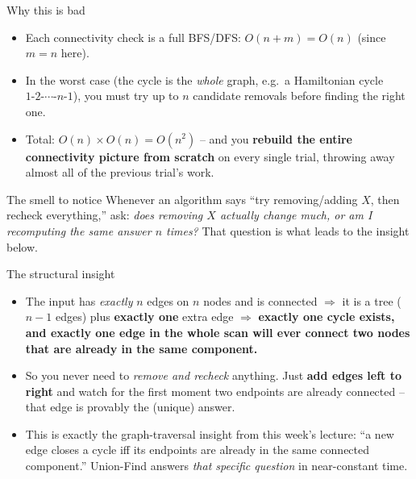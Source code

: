 \documentclass[11pt,aspectratio=169]{beamer}
\begin{document}
\begin{frame}{Why this is bad}
  \begin{itemize}
    \item Each connectivity check is a full BFS/DFS: $O(n+m) = O(n)$ (since $m=n$ here).
    \item In the worst case (the cycle is the \emph{whole} graph, e.g.\ a Hamiltonian
    cycle $1\text{-}2\text{-}\cdots\text{-}n\text{-}1$), you must try up to $n$ candidate
    removals before finding the right one.
    \item Total: $O(n) \times O(n) = O(n^2)$ -- and you \textbf{rebuild the entire
    connectivity picture from scratch} on every single trial, throwing away almost all
    of the previous trial's work.
  \end{itemize}
  \begin{alertblock}{The smell to notice}
    Whenever an algorithm says ``try removing/adding $X$, then recheck everything,''
    ask: \emph{does removing $X$ actually change much, or am I recomputing the same
    answer $n$ times?} That question is what leads to the insight below.
  \end{alertblock}
\end{frame}

\begin{frame}{The structural insight}
  \begin{itemize}
    \item The input has \emph{exactly} $n$ edges on $n$ nodes and is connected
    $\Rightarrow$ it is a tree ($n-1$ edges) plus \textbf{exactly one} extra edge
    $\Rightarrow$ \textbf{exactly one cycle exists, and exactly one edge in the whole
    scan will ever connect two nodes that are already in the same component.}
    \item So you never need to \emph{remove and recheck} anything. Just \textbf{add
    edges left to right} and watch for the first moment two endpoints are already
    connected -- that edge is provably the (unique) answer.
    \item This is exactly the graph-traversal insight from this week's lecture:
    ``a new edge closes a cycle iff its endpoints are already in the same connected
    component.'' Union-Find answers \emph{that specific question} in near-constant time.
  \end{itemize}
\end{frame}
\end{document}
